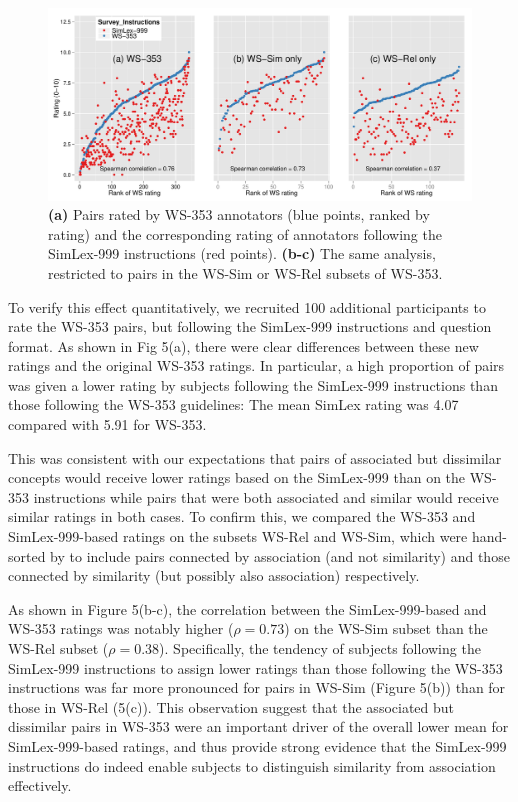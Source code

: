 \begin{figure}[ht]  \includegraphics[width =\textwidth]{Chapter_3/Figure_6_CL} \caption{{\bf(a)} Pairs rated by WS-353 annotators (blue points, ranked by rating) and the corresponding rating of annotators following the SimLex-999 instructions (red points). {\bf(b-c)} The same analysis, restricted to pairs in the WS-Sim or WS-Rel subsets of WS-353.}\end{figure}  



To verify this effect quantitatively, we recruited 100 additional participants to rate the WS-353 pairs, but following the SimLex-999 instructions and question format. As shown in Fig 5(a), there were clear differences between these new ratings and the original WS-353 ratings. In particular, a high proportion of pairs was given a lower rating by subjects following the SimLex-999 instructions than those following the WS-353 guidelines: The mean SimLex rating was 4.07 compared with 5.91 for WS-353. 



This was consistent with our expectations that pairs of associated but dissimilar concepts would receive lower ratings based on the SimLex-999 than on the WS-353 instructions while pairs that were both associated and similar would receive similar ratings in both cases. To confirm this, we compared the WS-353 and SimLex-999-based ratings on the subsets WS-Rel and WS-Sim, which were hand-sorted by \cite{agirre2009study} to include pairs connected by association (and not similarity) and those connected by similarity (but possibly also association) respectively.  



As shown in Figure 5(b-c), the correlation between the SimLex-999-based and WS-353 ratings was notably higher (\(\rho=0.73\)) on the WS-Sim subset than the WS-Rel subset (\(\rho=0.38\)). Specifically, the tendency of subjects following the SimLex-999 instructions to assign lower ratings than those following the WS-353 instructions was far more pronounced for pairs in WS-Sim (Figure 5(b)) than for those in WS-Rel (5(c)). This observation suggest that the associated but dissimilar pairs in WS-353 were an important driver of the overall lower mean for SimLex-999-based ratings, and thus provide strong evidence that the SimLex-999 instructions do indeed enable subjects to distinguish similarity from association effectively. 


